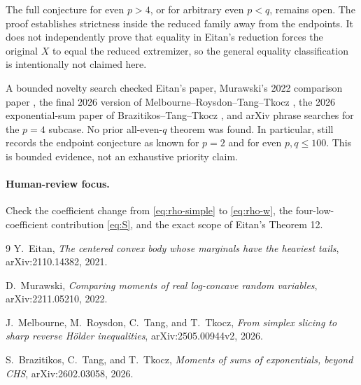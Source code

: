 \documentclass[11pt]{article}
\begin{document}
The full conjecture for even \(p>4\), or for arbitrary even \(p<q\), remains
open.  The proof establishes strictness inside the reduced family away from
the endpoints.  It does not independently prove that equality in Eitan's
reduction forces the original \(X\) to equal the reduced extremizer, so the
general equality classification is intentionally not claimed here.

A bounded novelty search checked Eitan's paper, Murawski's 2022 comparison
paper \cite{Murawski}, the final 2026 version of Melbourne--Roysdon--Tang--Tkocz
\cite{MRTT}, the 2026 exponential-sum paper of Brazitikos--Tang--Tkocz
\cite{BTT}, and arXiv phrase searches for the \(p=4\) subcase.  No prior
all-even-\(q\) theorem was found.  In particular, \cite{MRTT} still records
the endpoint conjecture as known for \(p=2\) and for even \(p,q\leq100\).
This is bounded evidence, not an exhaustive priority claim.

\paragraph{Human-review focus.}
Check the coefficient change from \eqref{eq:rho-simple} to
\eqref{eq:rho-w}, the four-low-coefficient contribution
\eqref{eq:S}, and the exact scope of Eitan's Theorem 12.

\begin{thebibliography}{9}
Y.~Eitan,
\emph{The centered convex body whose marginals have the heaviest tails},
arXiv:2110.14382, 2021.

D.~Murawski,
\emph{Comparing moments of real log-concave random variables},
arXiv:2211.05210, 2022.

J.~Melbourne, M.~Roysdon, C.~Tang, and T.~Tkocz,
\emph{From simplex slicing to sharp reverse H\"older inequalities},
arXiv:2505.00944v2, 2026.

S.~Brazitikos, C.~Tang, and T.~Tkocz,
\emph{Moments of sums of exponentials, beyond CHS},
arXiv:2602.03058, 2026.
\end{thebibliography}
\end{document}
